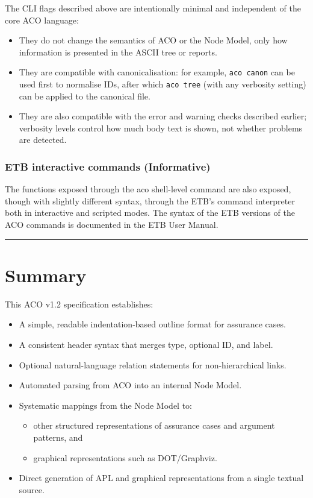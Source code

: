 \documentclass[11pt,twoside,a4paper]{article}
\begin{document}
The CLI flags described above are intentionally minimal and independent of the core ACO language:

\begin{itemize}[leftmargin=2em]
  \item They do not change the semantics of ACO or the Node Model, only how information is presented in the ASCII tree or reports.
  \item They are compatible with canonicalisation: for example, \texttt{aco canon} can be used first to normalise IDs, after which \texttt{aco tree} (with any verbosity setting) can be applied to the canonical file.
  \item They are also compatible with the error and warning checks described earlier; verbosity levels control how much body text is shown, not whether problems are detected.
\end{itemize}

\subsubsection*{ETB interactive commands (Informative)}

The functions exposed through the aco shell-level command are also exposed, though with slightly different syntax, through the ETB's command interpreter both in interactive and scripted modes.
The syntax of the ETB versions of the ACO commands is documented in the ETB User Manual.

\bigskip
\hrule
\bigskip

\section{Summary}

This ACO v1.2 specification establishes:

\begin{itemize}[leftmargin=2em]
  \item A simple, readable indentation-based outline format for assurance cases.
  \item A consistent header syntax that merges type, optional ID, and label.
  \item Optional natural-language relation statements for non-hierarchical links.
  \item Automated parsing from ACO into an internal Node Model.
  \item Systematic mappings from the Node Model to:
  \begin{itemize}[leftmargin=1.5em]
    \item other structured representations of assurance cases and argument patterns, and
    \item graphical representations such as DOT/Graphviz.
  \end{itemize}
  \item Direct generation of APL and graphical representations from a single textual source.
\end{itemize}
\end{document}
